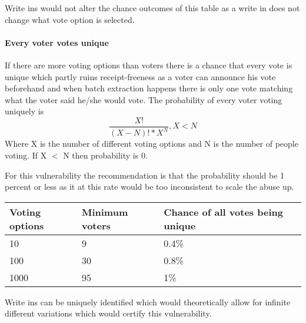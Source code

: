 Write ins would not alter the chance outcomes of this table as a write in does not change what vote option is selected.

\paragraph{Every voter votes unique}
If there are more voting options than voters there is a chance that every vote is unique which partly ruins receipt-freeness as a voter can announce his vote beforehand and when batch extraction happens there is only one vote matching what the voter said he/she would vote.
The probability of every voter voting uniquely is
\[ \frac{X!}{(X-N)!*X^N} , X < N \]
Where X is the number of different voting options and N is the number of people voting. If X $<$ N then probability is 0.

For this vulnerability the recommendation is that the probability should be 1 percent or less as it at this rate would be too inconsistent to scale the abuse up. 
\begin{table}[H]
\begin{tabular}{|l|l|l|}
\hline
Voting options & Minimum voters & Chance of all votes being unique \\ \hline
10                  & 9      & 0.4\%                             \\ \hline
100                 & 30     & 0.8\%                             \\ \hline
1000                & 95     & 1\%                             \\ \hline
\end{tabular}
\end{table}

Write ins can be uniquely identified which would theoretically allow for infinite different variations which would certify this vulnerability.


